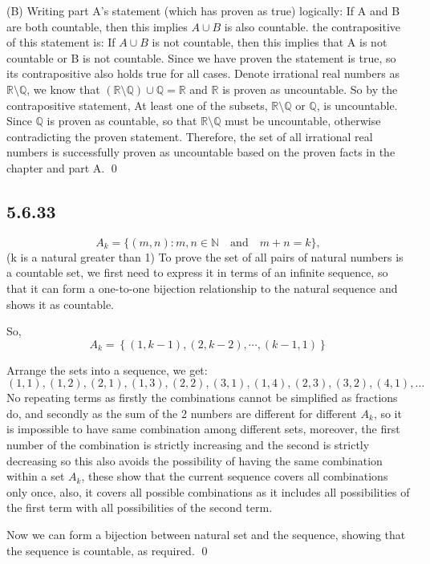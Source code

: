 \documentclass{article}
\begin{document}
(B) Writing part A's statement (which has proven as true) logically: If A and B are both countable, then this implies $A\cup B$ is also countable. the contrapositive of this statement is: If $A\cup B$ is not countable, then this implies that A is not countable or B is not countable. Since we have proven the statement is true, so its contrapositive also holds true for all cases. Denote irrational real numbers as $\mathbb{R}\setminus\mathbb{Q}$, we know that $(\mathbb{R}\setminus\mathbb{Q})\cup\mathbb{Q}=\mathbb{R}$ and $\mathbb{R}$ is proven as uncountable. So by the contrapositive statement, At least one of the subsets, $\mathbb{R}\setminus\mathbb{Q}$ or $\mathbb{Q}$, is uncountable. Since $\mathbb{Q}$ is proven as countable, so that $\mathbb{R}\setminus\mathbb{Q}$ must be uncountable, otherwise contradicting the proven statement. Therefore, the set of all irrational real numbers is successfully proven as uncountable based on the proven facts in the chapter and part A. \qed 

\subsection*{5.6.33}

$$A_k=\{(m,n)\colon m,n\in\mathbb{N}\quad\mathrm{and}\quad m+n=k\},$$ (k is a natural greater than 1) To prove the set of all pairs of natural numbers is a countable set, we first need to express it in terms of an infinite sequence, so that it can form a one-to-one bijection relationship to the natural sequence and shows it as countable.

So, $$A_k=\left\{(1,k-1),(2,k-2),\cdots,(k-1,1) \right\}$$

Arrange the sets into a sequence, we get: $$(1,1), (1,2), (2,1), (1,3),(2,2),(3,1),(1,4),(2,3),(3,2),(4,1),\ldots$$ No repeating terms as firstly the combinations cannot be simplified as fractions do, and secondly as the sum of the 2 numbers are different for different $A_k$, so it is impossible to have same combination among different sets, moreover, the first number of the combination is strictly increasing and the second is strictly decreasing so this also avoids the possibility of having the same combination within a set $A_k$, these show that the current sequence covers all combinations only once, also, it covers all possible combinations as it includes all possibilities of the first term with all possibilities of the second term. 

Now we can form a bijection between natural set and the sequence, showing that the sequence is countable, as required. \qed
\end{document}
